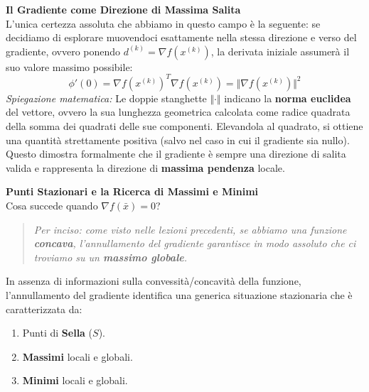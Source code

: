 \documentclass[12pt, a4paper]{article}
\newcommand{\separatore}{\noindent{\color{titlecolor!50}\rule{\textwidth}{0.6pt}}}
\begin{document}
	\vspace{0.4cm}
	\textbf{Il Gradiente come Direzione di Massima Salita}\\
	L'unica certezza assoluta che abbiamo in questo campo è la seguente: se decidiamo di esplorare muovendoci esattamente nella stessa direzione e verso del gradiente, ovvero ponendo $d^{(k)} = \nabla f(x^{(k)})$, la derivata iniziale assumerà il suo valore massimo possibile:
	\[ \phi'(0) = \nabla f(x^{(k)})^T \nabla f(x^{(k)}) = \Vert \nabla f(x^{(k)}) \Vert^2 \]
	\textit{Spiegazione matematica:} Le doppie stanghette $\Vert \cdot \Vert$ indicano la \textbf{norma euclidea} del vettore, ovvero la sua lunghezza geometrica calcolata come radice quadrata della somma dei quadrati delle sue componenti. Elevandola al quadrato, si ottiene una quantità strettamente positiva (salvo nel caso in cui il gradiente sia nullo). 
	Questo dimostra formalmente che il gradiente è sempre una direzione di salita valida e rappresenta la direzione di \textbf{massima pendenza} locale.
	
	\vspace{0.6cm}
	\separatore
	\vspace{0.4cm}
	
	\textbf{Punti Stazionari e la Ricerca di Massimi e Minimi}\\
	Cosa succede quando $\nabla f(\bar{x}) = 0$? 
	\begin{quote}
		\textit{Per inciso: come visto nelle lezioni precedenti, se abbiamo una funzione \textbf{concava}, l'annullamento del gradiente garantisce in modo assoluto che ci troviamo su un \textbf{massimo globale}.}
	\end{quote}
	
	In assenza di informazioni sulla convessità/concavità della funzione, l'annullamento del gradiente identifica una generica situazione stazionaria che è caratterizzata da:
	\begin{enumerate}
		\item Punti di \textbf{Sella} ($S$).
		\item \textbf{Massimi} locali e globali.
		\item \textbf{Minimi} locali e globali.
	\end{enumerate}
	
\end{document}
